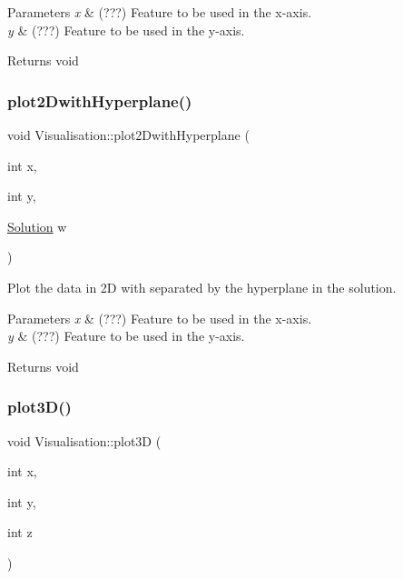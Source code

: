 \begin{DoxyParams}{Parameters}
{\em x} & (???) Feature to be used in the x-\/axis. \\
\hline
{\em y} & (???) Feature to be used in the y-\/axis. \\
\hline
\end{DoxyParams}
\begin{DoxyReturn}{Returns}
void 
\end{DoxyReturn}
\mbox{\label{class_visualisation_a39b7bd29878bfc2d21fc4219803fd99d}} 
\subsubsection{\texorpdfstring{plot2\+Dwith\+Hyperplane()}{plot2DwithHyperplane()}}
{\footnotesize\ttfamily void Visualisation\+::plot2\+Dwith\+Hyperplane (\begin{DoxyParamCaption}\item[{int}]{x,  }\item[{int}]{y,  }\item[{\hyperlink{class_solution}{Solution}}]{w }\end{DoxyParamCaption})}



Plot the data in 2D with separated by the hyperplane in the solution. 


\begin{DoxyParams}{Parameters}
{\em x} & (???) Feature to be used in the x-\/axis. \\
\hline
{\em y} & (???) Feature to be used in the y-\/axis. \\
\hline
\end{DoxyParams}
\begin{DoxyReturn}{Returns}
void 
\end{DoxyReturn}
\mbox{\label{class_visualisation_a39cf83c146a4c92a32782bfdf6168594}} 
\subsubsection{\texorpdfstring{plot3\+D()}{plot3D()}}
{\footnotesize\ttfamily void Visualisation\+::plot3D (\begin{DoxyParamCaption}\item[{int}]{x,  }\item[{int}]{y,  }\item[{int}]{z }\end{DoxyParamCaption})}



